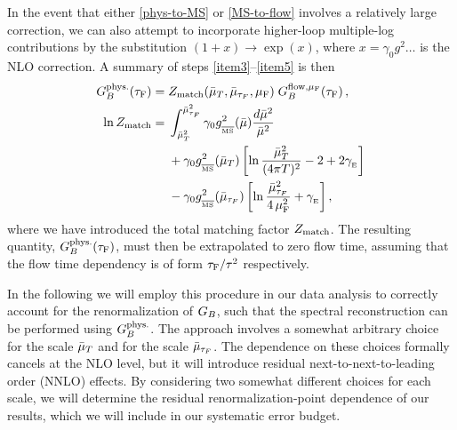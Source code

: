 \documentclass[floatfix,twocolumn,prd,showpacs,preprintnumbers,amsmath,nofootinbib,amssymb,superscriptaddress]{revtex4-2}
\begin{document}
In the event that either \cref{phys-to-MS} or \cref{MS-to-flow} involves a relatively large correction, we can also attempt to incorporate higher-loop multiple-log contributions by the substitution $(1+x) \to \exp(x)$, where $x=\gamma_0 g^2 \ldots$ is the NLO correction.
A summary of steps \ref{item3}--\ref{item5} is then
\begin{align}
    \label{eq:Ztotal}
    G_B^{\text{phys.}}(\tau_\mathrm{F}) = {} & Z_{\mathrm{match}}(\bar{\mu}_{T},\bar{\mu}_{\tau_F},\mu_\mathrm{F}) \; G_{B}^{\mathrm{flow}, \mu_\mathrm{F}}(\tau_\mathrm{F}) \,,
    \nonumber \\
    \ln Z_{\mathrm{match}} = {} &  \int^{\bar{\mu}_{\tau_F}^2}_{\bar{\mu}_{T}^2}\gamma_0 g^2_{_{\overline{\mathrm{MS}}}}(\bar{\mu})
    \frac{d\bar{\mu}^2}{\bar{\mu}^2} \\
    & + \gamma_0 g^2_{_{\overline{\mathrm{MS}}}}(\bar{\mu}_{T}) \left[
    \ln \frac{\bar{\mu}_{T}^2}{(4\pi T)^2} - 2 + 2 \gamma_{_{\mathrm{E}}} \right]
    \nonumber \\ \nonumber
    &  - \gamma_0 g^2_{_{\overline{\mathrm{MS}}}}(\bar{\mu}_{\tau_F}) \left[ \ln\frac{\bar{\mu}_{\tau_F}^2}{4\,\mu_\mathrm{F}^2} + \gamma_{_{\mathrm{E}}} \right],
\end{align}
where we have introduced the total matching factor $Z_{\mathrm{match}}$.
The resulting quantity, $G_B^{\text{phys.}}(\tau_\mathrm{F})$, must then be extrapolated to zero flow time, assuming that the flow time dependency is of form $\tau_\mathrm{F}/\tau^2$ respectively.

In the following we will employ this procedure in our data analysis to correctly account for the renormalization of $G_B$, such that the spectral reconstruction can be performed using $G_B^{\text{phys.}}$.
The approach involves a somewhat arbitrary choice for the scale $\bar{\mu}_{T}$ and for the scale $\bar{\mu}_{\tau_F}$.
The dependence on these choices formally cancels at the NLO level, but it will introduce residual next-to-next-to-leading order (NNLO) effects.
By considering two somewhat different choices for each scale, we will determine the residual renormalization-point dependence of our results, which we will include in our systematic error budget.
\end{document}
